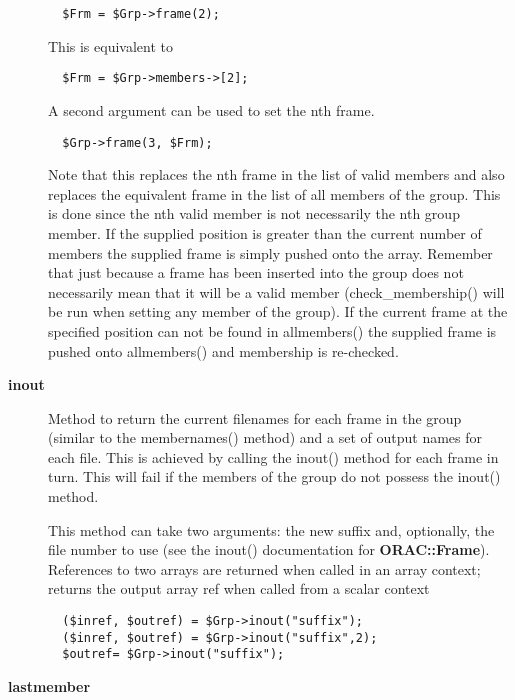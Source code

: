 \begin{description}
\begin{verbatim}
  $Frm = $Grp->frame(2);
\end{verbatim}


This is equivalent to

\begin{verbatim}
  $Frm = $Grp->members->[2];
\end{verbatim}


A second argument can be used to set the nth frame.

\begin{verbatim}
  $Grp->frame(3, $Frm);
\end{verbatim}


Note that this replaces the nth frame in the list of valid members and
also replaces the equivalent frame in the list of all members of the
group. This is done since the nth valid member is not necessarily the
nth group member. If the supplied position is greater than the current
number of members the supplied frame is simply pushed onto the
array. Remember that just because a frame has been inserted into the
group does not necessarily mean that it will be a valid member
(check\_membership() will be run when setting any member of the group).
If the current frame at the specified position can not be found in
allmembers() the supplied frame is pushed onto allmembers() and
membership is re-checked.

\item[\textbf{inout}] \mbox{}

Method to return the current filenames for each frame in the
group (similar to the membernames() method) and a set of output
names for each file. This is achieved by calling the inout()
method for each frame in turn. This will fail if the members of the
group do not possess the inout() method.



This method can take two arguments: the new suffix and, optionally,
the file number to use (see the inout() documentation for
\textbf{ORAC::Frame}). References to two arrays are returned when called
in an array context; returns the output array ref when called
from a scalar context

\begin{verbatim}
  ($inref, $outref) = $Grp->inout("suffix");
  ($inref, $outref) = $Grp->inout("suffix",2);
  $outref= $Grp->inout("suffix");
\end{verbatim}
\item[\textbf{lastmember}] \mbox{}


\end{description}
